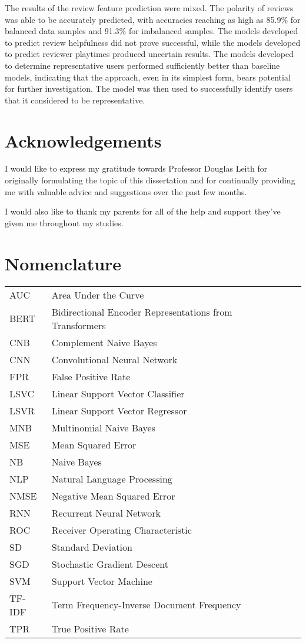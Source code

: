 \documentclass[a4paper,oneside,12pt]{book}
\begin{document}
The results of the review feature prediction were mixed. The polarity of reviews was able to be accurately predicted, with accuracies reaching as high as 85.9\% for balanced data samples and 91.3\% for imbalanced samples. The models developed to predict review helpfulness did not prove successful, while the models developed to predict reviewer playtimes produced uncertain results. The models developed to determine representative users performed sufficiently better than baseline models, indicating that the approach, even in its simplest form, bears potential for further investigation. The model was then used to successfully identify users that it considered to be representative.

\newpage
\onehalfspacing\raggedright

\section*{\Huge{Acknowledgements}}

I would like to express my gratitude towards Professor Douglas Leith for originally formulating the topic of this dissertation and for continually providing me with valuable advice and suggestions over the past few months.

I would also like to thank my parents for all of the help and support they've given me throughout my studies.

\tableofcontents
\listoffigures
\listoftables
\lstlistoflistings
\newpage

\section*{\Huge{Nomenclature}}
\begin{tabular}{lp{9cm}l}
AUC&Area Under the Curve\\
BERT&Bidirectional Encoder Representations from Transformers\\
CNB&Complement Naive Bayes\\
CNN&Convolutional Neural Network\\
FPR&False Positive Rate\\
LSVC&Linear Support Vector Classifier\\
LSVR&Linear Support Vector Regressor\\
MNB&Multinomial Naive Bayes\\
MSE&Mean Squared Error\\
NB&Naive Bayes\\
NLP&Natural Language Processing\\
NMSE&Negative Mean Squared Error\\
RNN&Recurrent Neural Network\\
ROC&Receiver Operating Characteristic\\
SD&Standard Deviation\\
SGD&Stochastic Gradient Descent\\
SVM&Support Vector Machine\\
TF-IDF&Term Frequency-Inverse Document Frequency\\
TPR&True Positive Rate\\
\end{tabular}
\vspace{2cm}
\end{document}
